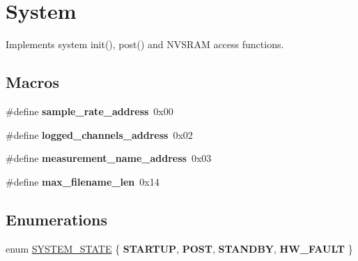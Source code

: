 \hypertarget{group__system}{}\section{System}
\label{group__system}


Implements system init(), post() and N\+V\+S\+R\+A\+M access functions.  


\subsection*{Macros}
\begin{DoxyCompactItemize}
\item 
\hypertarget{group__system_gaad363db1fc3eedc68c27a8ce277bbb5e}{}\#define {\bfseries sample\+\_\+rate\+\_\+address}~0x00\label{group__system_gaad363db1fc3eedc68c27a8ce277bbb5e}

\item 
\hypertarget{group__system_ga378eaa994ca7256adbe5a4f5c2480543}{}\#define {\bfseries logged\+\_\+channels\+\_\+address}~0x02\label{group__system_ga378eaa994ca7256adbe5a4f5c2480543}

\item 
\hypertarget{group__system_gadeefcb6ed4e46bce11baf5221a83416d}{}\#define {\bfseries measurement\+\_\+name\+\_\+address}~0x03\label{group__system_gadeefcb6ed4e46bce11baf5221a83416d}

\item 
\hypertarget{group__system_gad1724fdab64f4d133f6236d75656ca05}{}\#define {\bfseries max\+\_\+filename\+\_\+len}~0x14\label{group__system_gad1724fdab64f4d133f6236d75656ca05}

\end{DoxyCompactItemize}
\subsection*{Enumerations}
\begin{DoxyCompactItemize}
\item 
enum \hyperlink{group__system_gafeac06fb8e1e94bfba7df88a6e219d71}{S\+Y\+S\+T\+E\+M\+\_\+\+S\+T\+A\+T\+E} \{ {\bfseries S\+T\+A\+R\+T\+U\+P}, 
{\bfseries P\+O\+S\+T}, 
{\bfseries S\+T\+A\+N\+D\+B\+Y}, 
{\bfseries H\+W\+\_\+\+F\+A\+U\+L\+T}
 \}
\end{DoxyCompactItemize}

